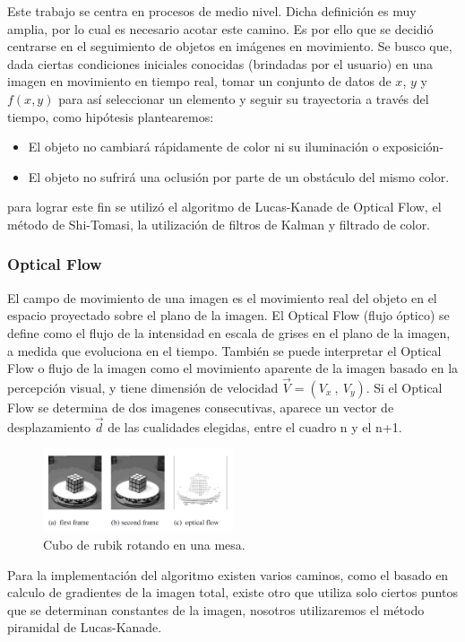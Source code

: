 Este trabajo se centra en procesos de medio nivel. Dicha definición es muy amplia, por lo cual es necesario acotar este camino. Es por ello que se decidió centrarse en el seguimiento de objetos en imágenes en movimiento. Se busco que, dada ciertas condiciones iniciales conocidas (brindadas por el usuario) en una imagen en movimiento en tiempo real, tomar un conjunto de datos de $x$, $y$ y $f(x,y)$ para así seleccionar un elemento y seguir su trayectoria a través del tiempo, como hipótesis plantearemos:
\begin{itemize}
\item El objeto no cambiará rápidamente de color ni su iluminación o exposición-
\item El objeto no sufrirá una oclusión por parte de un obstáculo del mismo color.
\end{itemize} para lograr este fin se utilizó el algoritmo de Lucas-Kanade de Optical Flow, el método de Shi-Tomasi, la utilización de filtros de Kalman y filtrado de color.
\subsubsection{Optical Flow} 
El campo de movimiento de una imagen es el movimiento real del objeto en el espacio proyectado sobre el plano de la imagen. El Optical Flow (flujo óptico) se define como el flujo de la intensidad en escala de grises en el plano de la imagen, a medida que evoluciona en el tiempo. También se puede interpretar el Optical Flow o flujo de la imagen como el movimiento aparente de la imagen  basado en la percepción visual, y tiene dimensión de velocidad $\vec{V}= (V_x \ , \ V_y)$. Si el Optical Flow se determina de dos imagenes consecutivas, aparece un vector de desplazamiento $\vec{d}$ de las cualidades elegidas, entre el cuadro n y el n+1.
\begin{figure}[H]
		\centering
		\includegraphics[width=0.5\textwidth]{Imagenes/opticalflowrubick.png}
		\caption{Cubo de rubik rotando en una mesa.}
		\label{fig:opticalflow1}
\end{figure}
Para la implementación del algoritmo existen varios caminos, como el basado en calculo de gradientes de la imagen total, existe otro que utiliza solo ciertos puntos que se determinan constantes de la imagen, nosotros utilizaremos el método piramidal de Lucas-Kanade.
